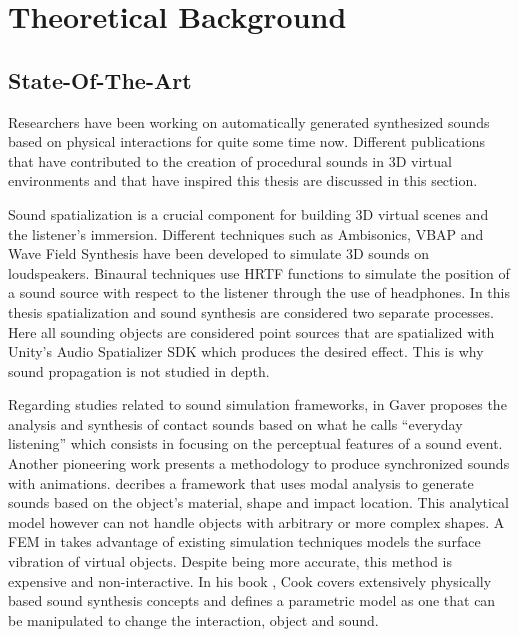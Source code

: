 \chapter{Theoretical Background}\label{ch:theory}

\section{State-Of-The-Art}\label{sec:state_art}





Researchers have been working on automatically generated synthesized sounds based on physical interactions for quite some time now. Different publications that have contributed to the creation of procedural sounds in 3D virtual environments and that have inspired this thesis are discussed in this section.

Sound spatialization is a crucial component for building 3D virtual scenes and the listener's immersion. Different techniques such as Ambisonics, VBAP and Wave Field Synthesis have been developed to simulate 3D sounds on loudspeakers. Binaural techniques use HRTF functions to simulate the position of a sound source with respect to the listener through the use of headphones. In this thesis spatialization and sound synthesis are considered two separate processes. Here all sounding objects are considered point sources that are spatialized with Unity's Audio Spatializer SDK \cite{bib:unity_doc} which produces the desired effect. This is why sound propagation is not studied in depth. 

Regarding studies related to sound simulation frameworks, in \cite{gaver1993we, gaver1993world} Gaver proposes the analysis and synthesis of contact sounds based on what he calls ``everyday listening'' which consists in focusing on the perceptual features of a sound event. Another pioneering work \cite{takala1992sound} presents a methodology to produce synchronized sounds with animations. \cite{van1998sounds} decribes a framework that uses modal analysis to generate sounds based on the object's material, shape and impact location. This analytical model however can not handle objects with arbitrary or more complex shapes. A \gls{FEM} in \cite{director2001synthesizing} takes advantage of existing simulation techniques models the surface vibration of virtual objects. Despite being more accurate, this method is expensive and non-interactive. In his book \cite{Cook:2002:RSS:515316}, Cook covers extensively physically based sound synthesis concepts and defines a parametric model as one that can be manipulated to change the interaction, object and sound.  

